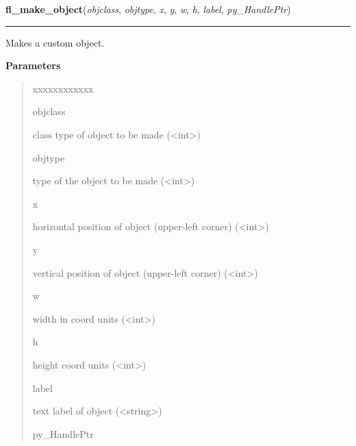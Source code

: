     \vspace{0.5ex}

\hspace{.8\funcindent}\begin{boxedminipage}{\funcwidth}

    \raggedright \textbf{fl\_make\_object}(\textit{objclass}, \textit{objtype}, \textit{x}, \textit{y}, \textit{w}, \textit{h}, \textit{label}, \textit{py\_HandlePtr})

    \vspace{-1.5ex}

    \rule{\textwidth}{0.5\fboxrule}
\setlength{\parskip}{2ex}
    Makes a custom object.

\setlength{\parskip}{1ex}
      \textbf{Parameters}
      \vspace{-1ex}

      \begin{quote}
        \begin{Ventry}{xxxxxxxxxxxx}

          \item[objclass]

          class type of object to be made ({\textless}int{\textgreater})

          \item[objtype]

          type of the object to be made ({\textless}int{\textgreater})

          \item[x]

          horizontal position of object (upper-left corner) 
          ({\textless}int{\textgreater})

          \item[y]

          vertical position of object (upper-left corner) 
          ({\textless}int{\textgreater})

          \item[w]

          width in coord units ({\textless}int{\textgreater})

          \item[h]

          height coord units ({\textless}int{\textgreater})

          \item[label]

          text label of object ({\textless}string{\textgreater})

          \item[py\_HandlePtr]


\end{Ventry}
\end{quote}
\end{boxedminipage}

